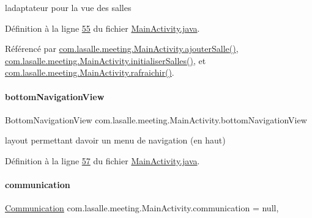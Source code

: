 l\textquotesingle{}adaptateur pour la vue des salles 



Définition à la ligne \hyperlink{_main_activity_8java_source_l00055}{55} du fichier \hyperlink{_main_activity_8java_source}{Main\+Activity.\+java}.



Référencé par \hyperlink{_main_activity_8java_source_l00239}{com.\+lasalle.\+meeting.\+Main\+Activity.\+ajouter\+Salle()}, \hyperlink{_main_activity_8java_source_l00213}{com.\+lasalle.\+meeting.\+Main\+Activity.\+initialiser\+Salles()}, et \hyperlink{_main_activity_8java_source_l00330}{com.\+lasalle.\+meeting.\+Main\+Activity.\+rafraichir()}.

\mbox{\label{classcom_1_1lasalle_1_1meeting_1_1_main_activity_abc43c4bd4402dd5b7066773a2276244b}} 
\paragraph{\texorpdfstring{bottom\+Navigation\+View}{bottomNavigationView}}
{\footnotesize\ttfamily Bottom\+Navigation\+View com.\+lasalle.\+meeting.\+Main\+Activity.\+bottom\+Navigation\+View\hspace{0.3cm}{\ttfamily [private]}}



layout permettant d\textquotesingle{}avoir un menu de navigation (en haut) 



Définition à la ligne \hyperlink{_main_activity_8java_source_l00057}{57} du fichier \hyperlink{_main_activity_8java_source}{Main\+Activity.\+java}.

\mbox{\label{classcom_1_1lasalle_1_1meeting_1_1_main_activity_a6a358d10ba0f56af3b548e41902db273}} 
\paragraph{\texorpdfstring{communication}{communication}}
{\footnotesize\ttfamily \hyperlink{classcom_1_1lasalle_1_1meeting_1_1_communication}{Communication} com.\+lasalle.\+meeting.\+Main\+Activity.\+communication = null\hspace{0.3cm}{\ttfamily [static]}, {\ttfamily [private]}}




